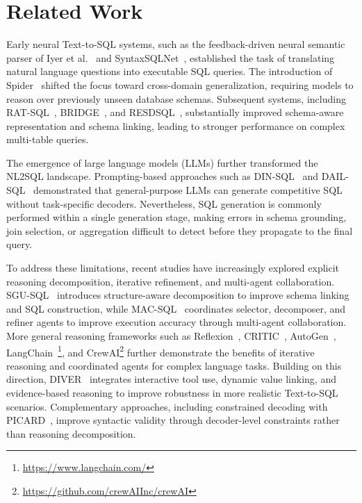 \documentclass{svproc}
\begin{document}
\section{Related Work}
\label{sec:related}

Early neural Text-to-SQL systems, such as the feedback-driven neural semantic parser of Iyer et al.~\cite{iyer2017neural} and SyntaxSQLNet~\cite{yu2018syntaxsqlnet}, established the task of translating natural language questions into executable SQL queries. The introduction of Spider~\cite{yu2018spider} shifted the focus toward cross-domain generalization, requiring models to reason over previously unseen database schemas. Subsequent systems, including RAT-SQL~\cite{wang2020ratsql}, BRIDGE~\cite{lin2020bridge}, and RESDSQL~\cite{li2023resdsql}, substantially improved schema-aware representation and schema linking, leading to stronger performance on complex multi-table queries.


The emergence of large language models (LLMs) further transformed the NL2SQL landscape. Prompting-based approaches such as DIN-SQL~\cite{pourreza2023dinsql} and DAIL-SQL~\cite{gao2023dailsql} demonstrated that general-purpose LLMs can generate competitive SQL without task-specific decoders. Nevertheless, SQL generation is commonly performed within a single generation stage, making errors in schema grounding, join selection, or aggregation difficult to detect before they propagate to the final query.

To address these limitations, recent studies have increasingly explored explicit reasoning decomposition, iterative refinement, and multi-agent collaboration. SGU-SQL~\cite{zhang2025sgusql} introduces structure-aware decomposition to improve schema linking and SQL construction, while MAC-SQL~\cite{wang2025macsql} coordinates selector, decomposer, and refiner agents to improve execution accuracy through multi-agent collaboration. More general reasoning frameworks such as Reflexion~\cite{shinn2023reflexion}, CRITIC~\cite{gou2024critic}, AutoGen~\cite{wang2023autogen}, LangChain~\footnote{\url{https://www.langchain.com/}}, and CrewAI\footnote{\url{https://github.com/crewAIInc/crewAI}} further demonstrate the benefits of iterative reasoning and coordinated agents for complex language tasks. Building on this direction, DIVER~\cite{nan2026diver} integrates interactive tool use, dynamic value linking, and evidence-based reasoning to improve robustness in more realistic Text-to-SQL scenarios. Complementary approaches, including constrained decoding with PICARD~\cite{scholak2021picard}, improve syntactic validity through decoder-level constraints rather than reasoning decomposition.
\end{document}
